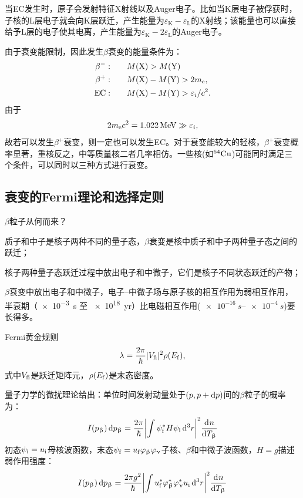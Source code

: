 当EC发生时，原子会发射特征X射线以及Auger电子。比如当K层电子被俘获时，子核的L层电子就会向K层跃迁，产生能量为$\varepsilon_\mathrm K - \varepsilon_\mathrm L$的X射线；该能量也可以直接给予L层的电子使其电离，产生能量为$\varepsilon_\mathrm K - 2\varepsilon_{\mathrm L}$的Auger电子。

由于衰变能限制，因此发生$\beta$衰变的能量条件为：
\begin{align}
	\beta^-:&\qquad M(\mathrm{X}) > M(\mathrm{Y})\\
	\beta^+:&\qquad M(\mathrm{X}) - M(\mathrm{Y}) > 2m_{\mathrm{e}},\\
	\mathrm{EC}:&\qquad M(\mathrm{X}) - M(\mathrm{Y}) > \varepsilon_i / c^2.
\end{align}
由于
\[
	2m_{\mathrm{e}} c^2 = \qty{1.022}{MeV} \gg \varepsilon_i,
\]
故若可以发生$\beta^+$衰变，则一定也可以发生EC。对于衰变能较大的轻核，$\beta^+$衰变概率显著，重核反之，中等质量核二者几率相仿。一些核(如$\nuclide{64}{Cu}$)可能同时满足三个条件，可以同时以三种方式进行衰变。
\begin{notecaptionblock}
\end{notecaptionblock}

\subsection{\betaray 衰变的Fermi理论和选择定则}

$\beta$粒子从何而来？
\begin{compactenum}
	\item 质子和中子是核子两种不同的量子态，$\beta$衰变是核中质子和中子两种量子态之间的跃迁；
	\item 核子两种量子态跃迁过程中放出电子和中微子，它们是核子不同状态跃迁的产物；
	\item $\beta$衰变中放出电子和中微子，电子--中微子场与原子核的相互作用为弱相互作用，半衰期（\qty{e-3}{s} 至 \qty{e18}{yr}）比电磁相互作用($\qtyrange{e-16}{e-4}{s}$)要长得多。
\end{compactenum}
Fermi黄金规则
\begin{align}
	\lambda = \frac{2\pi}\hbar\lvert V_{\mathrm f\mathrm i}\rvert^2\rho(E_\mathrm f),
\end{align}
式中$V_{\final\initial}$是跃迁矩阵元，$\rho(E_\mathrm f)$是末态密度。

量子力学的微扰理论给出：单位时间发射动量处于$(p,p + \mathop{}\!\mathrm{d} p)$间的$\beta$粒子的概率为：
\[
	I(p_\upbeta)\mathop{}\!\mathrm{d} p_\upbeta = \frac{2\pi}\hbar\biggl\lvert\int\psi_\mathrm f^\ast H\psi_\mathrm i\mathop{}\!\mathrm{d}^3r\biggr\rvert^2\frac{\mathop{}\!\mathrm{d}^{}n}{\mathrm{d}{T_\upbeta}^{}}
\]
初态$\psi_\mathrm i = u_\mathrm i$母核波函数，末态$\psi_\mathrm f = u_\mathrm f\varphi_\upbeta\varphi_\upnu$子核、$\beta$和中微子波函数，$H = g$描述弱作用强度：
\[
	I(p_\upbeta)\mathop{}\!\mathrm{d} p_\upbeta = \frac{2\pi g^2}\hbar\biggl\lvert\int u_\mathrm f^\ast\varphi_\upbeta^\ast\varphi_\upnu^\ast u_\mathrm i\mathop{}\!\mathrm{d}^3r\biggr\rvert^2\frac{\mathop{}\!\mathrm{d}^{}n}{\mathrm{d}{T_\upbeta}^{}}
\]

